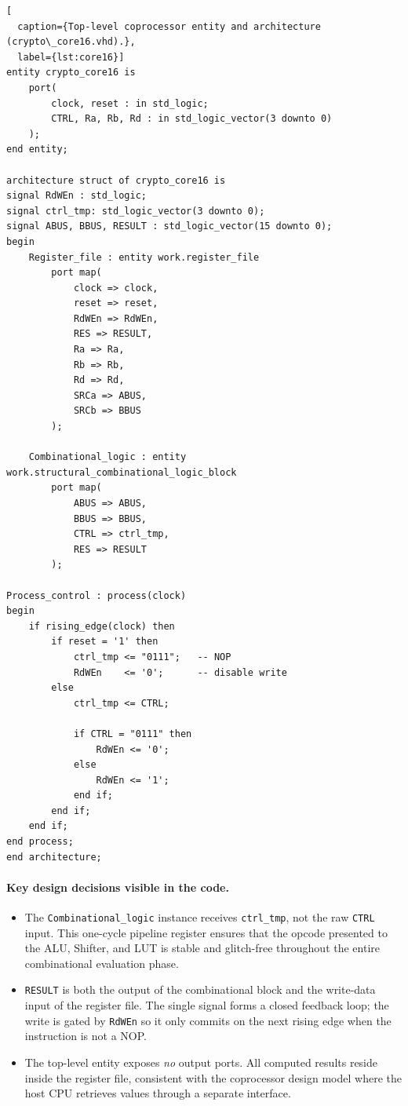 \documentclass[12pt, a4paper]{report}
\begin{document}
\begin{lstlisting}[
  caption={Top-level coprocessor entity and architecture (crypto\_core16.vhd).},
  label={lst:core16}]
entity crypto_core16 is
	port(
		clock, reset : in std_logic;
	    CTRL, Ra, Rb, Rd : in std_logic_vector(3 downto 0)
	);
end entity;

architecture struct of crypto_core16 is
signal RdWEn : std_logic;
signal ctrl_tmp: std_logic_vector(3 downto 0);
signal ABUS, BBUS, RESULT : std_logic_vector(15 downto 0);
begin
	Register_file : entity work.register_file
		port map(
			clock => clock,
			reset => reset,
			RdWEn => RdWEn,
			RES => RESULT,
			Ra => Ra,
			Rb => Rb,
			Rd => Rd,
			SRCa => ABUS,
			SRCb => BBUS
		);
		
	Combinational_logic : entity work.structural_combinational_logic_block
		port map(
			ABUS => ABUS,
			BBUS => BBUS,
			CTRL => ctrl_tmp,
			RES => RESULT
		);
		
Process_control : process(clock)
begin
    if rising_edge(clock) then
        if reset = '1' then
            ctrl_tmp <= "0111";   -- NOP
            RdWEn    <= '0';      -- disable write
        else
            ctrl_tmp <= CTRL;

            if CTRL = "0111" then
                RdWEn <= '0';
            else
                RdWEn <= '1';
            end if;
        end if;
    end if;
end process;
end architecture;
\end{lstlisting}

\newpage
\paragraph{Key design decisions visible in the code.}
\begin{itemize}
  \item The \texttt{Combinational\_logic} instance receives \texttt{ctrl\_tmp},
        not the raw \texttt{CTRL} input. This one-cycle pipeline register ensures
        that the opcode presented to the ALU, Shifter, and LUT is stable and
        glitch-free throughout the entire combinational evaluation phase.
  \item \texttt{RESULT} is both the output of the combinational block and the
        write-data input of the register file. The single signal forms a closed
        feedback loop; the write is gated by \texttt{RdWEn} so it only commits
        on the next rising edge when the instruction is not a NOP.
  \item The top-level entity exposes \emph{no} output ports. All computed
        results reside inside the register file, consistent with the
        coprocessor design model where the host CPU retrieves values
        through a separate interface.
\end{itemize}
\end{document}
